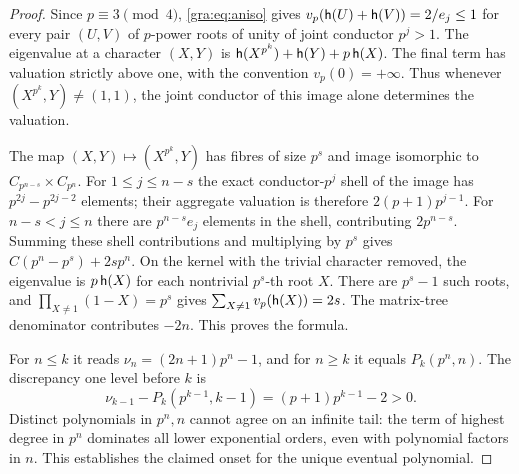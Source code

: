 \begin{proof}
Since $p\equiv3\pmod4$, \cref{gra:eq:aniso} gives
$v_p(\mathsf{h}(U)+\mathsf{h}(V))=2/e_j\le1$ for every pair $(U,V)$ of $p$-power
roots of unity of joint conductor $p^j>1$. The eigenvalue at a character $(X,Y)$ is
$\mathsf{h}(X^{p^k})+\mathsf{h}(Y)+p\,\mathsf{h}(X)$. The final term has valuation
strictly above one, with the convention $v_p(0)=+\infty$. Thus whenever
$(X^{p^k},Y)\ne(1,1)$, the joint conductor of this image alone determines
the valuation.

The map $(X,Y)\mapsto(X^{p^k},Y)$ has fibres of size $p^s$ and image
isomorphic to $C_{p^{n-s}}\times C_{p^n}$. For $1\le j\le n-s$ the exact
conductor-$p^j$ shell of the image has $p^{2j}-p^{2j-2}$ elements; their
aggregate valuation is therefore $2(p+1)p^{j-1}$. For $n-s<j\le n$ there
are $p^{n-s}e_j$ elements in the shell, contributing $2p^{n-s}$. Summing
these shell contributions and multiplying by $p^s$ gives
$C(p^n-p^s)+2sp^n$. On the kernel with the trivial character removed, the
eigenvalue is $p\,\mathsf{h}(X)$ for each nontrivial $p^s$-th root $X$. There
are $p^s-1$ such roots, and $\prod_{X\ne1}(1-X)=p^s$ gives
$\sum_{X\ne1}v_p(\mathsf{h}(X))=2s$. The matrix-tree denominator contributes
$-2n$. This proves the formula.

For $n\le k$ it reads $\nu_n=(2n+1)p^n-1$, and for $n\ge k$ it equals
$P_k(p^n,n)$. The discrepancy one level before $k$ is
\[
 \nu_{k-1}-P_k(p^{k-1},k-1)=(p+1)p^{k-1}-2>0 .
\]
Distinct polynomials in $p^n,n$ cannot agree on an infinite tail: the term
of highest degree in $p^n$ dominates all lower exponential orders, even
with polynomial factors in $n$. This establishes the claimed onset for the
unique eventual polynomial.
\end{proof}


